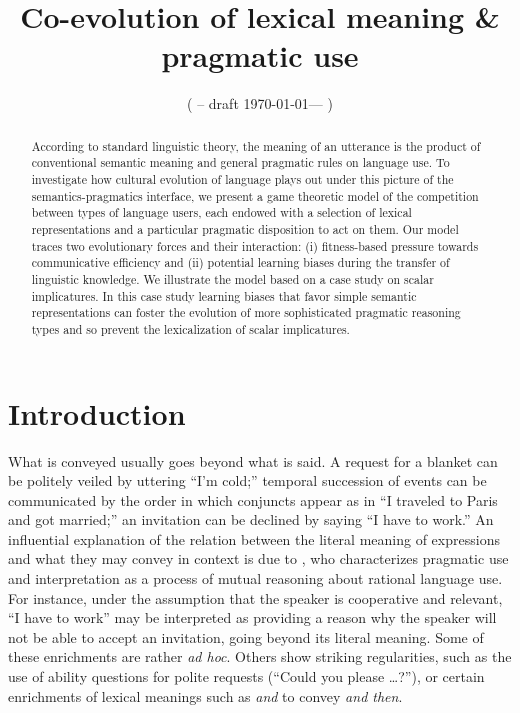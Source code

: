 \documentclass[a4paper, 11pt]{article}
\title{Co-evolution of lexical meaning \& pragmatic use}
\author{%
    ( -- draft \today --- )
}
\date{}
\theoremstyle{Satz}
\begin{document}

\maketitle

\begin{abstract}
  According to standard linguistic theory, the meaning of an utterance is the product of
  conventional semantic meaning and general pragmatic rules on language use. To investigate how
  cultural evolution of language plays out under this picture of the semantics-pragmatics
  interface, we present a game theoretic model of the competition between types of language
  users, each endowed with a selection of lexical representations and a particular pragmatic
  disposition to act on them. Our model traces two evolutionary forces and their interaction:
  (i) fitness-based pressure towards communicative efficiency and (ii) potential learning
  biases during the transfer of linguistic knowledge. We illustrate the model based on a case
  study on scalar implicatures. In this case study learning biases that favor simple semantic
  representations can foster the evolution of more sophisticated pragmatic reasoning types and
  so prevent the lexicalization of scalar implicatures.
\end{abstract}

\section{Introduction}\label{sec:introduction}
What is conveyed usually goes beyond what is said. A request for a blanket can be politely
veiled by uttering ``I'm cold;'' temporal succession of events can be communicated by the order
in which conjuncts appear as in ``I traveled to Paris and got married;'' an invitation can be
declined by saying ``I have to work.'' An influential explanation of the relation between the
literal meaning of expressions and what they may convey in context is due to
\citet{grice:1975}, who characterizes pragmatic use and interpretation as a process of mutual
reasoning about rational language use. For instance, under the assumption that the speaker is
cooperative and relevant, ``I have to work'' may be interpreted as providing a reason why the
speaker will not be able to accept an invitation, going beyond its literal meaning. Some of
these enrichments are rather \emph{ad hoc}. Others show striking regularities, such as the use
of ability questions for polite requests (``Could you please \dots?''), or certain enrichments
of lexical meanings such as \emph{and} to convey \emph{and then}.
\end{document}
